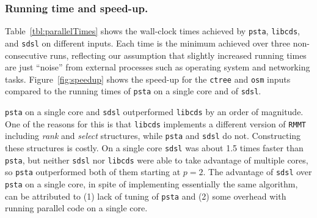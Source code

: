 \subsubsection{Running time and speed-up.}

Table~\ref{tbl:parallelTimes} shows the wall-clock times achieved by
{\tt psta}, {\tt libcds}, and {\tt sdsl} on different inputs.
Each time is the minimum achieved over three non-consecutive runs, reflecting
our assumption that slightly increased running times are just
``noise'' from external processes such as operating system and networking tasks.
Figure~\ref{fig:speedup} shows the speed-up for the {\tt ctree} and {\tt osm}
inputs compared to the running times of {\tt psta} on a single core and
of {\tt sdsl}.

{\tt psta} on a single core and {\tt sdsl} outperformed {\tt libcds} by an order
of magnitude.
One of the reasons for this is that {\tt libcds} implements a different version
of {\tt RMMT} including {\em rank} and {\em select} structures, while
{\tt psta} and {\tt sdsl} do not.
Constructing these structures is costly.
On a single core {\tt sdsl} was about 1.5 times faster than {\tt psta}, but
neither {\tt sdsl} nor {\tt libcds} were able to take advantage of multiple
cores, so {\tt psta} outperformed both of them starting at $p = 2$.
The advantage of {\tt sdsl} over {\tt psta} on a single core, in spite of
implementing essentially the same algorithm, can be attributed to (1) lack of
tuning of {\tt psta} and (2) some overhead with running parallel code
on a single core.

